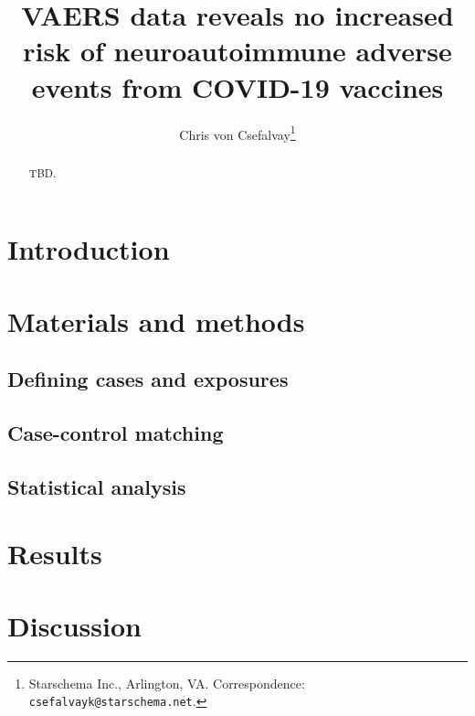 \documentclass{article}
\title{VAERS data reveals no increased risk of neuroautoimmune adverse events from COVID-19 vaccines}
\author{Chris von Csefalvay\thanks{Starschema Inc., Arlington, VA. Correspondence: \texttt{csefalvayk@starschema.net}.}}
\begin{document}
	\maketitle

\begin{abstract}
TBD.
\end{abstract}

\section{Introduction}
	
\section{Materials and methods}

\subsection{Defining cases and exposures}	
	
\subsection{Case-control matching}
	
\subsection{Statistical analysis}
	
\section{Results}

\section{Discussion}
\end{document}
